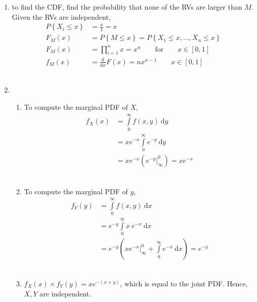 \begin{enumerate}
\begin{enumerate}
		
	\end{enumerate}
	
	\item to find the CDF, find the probability that none of the RVs are larger than $ M $. Given the RVs are independent, \\
	
	
		\begin{align}
			P\left\{X_i \leq x \right\} &= \frac{x}{1} = x \nonumber \\
			F_M (x) &= P\left\{M \leq x\right\} = P\left\{X_1 \leq x, \dots , X_n \leq x\right\} \nonumber \\
			F_M (x) &= \prod_{i = 1}^{n} x = x^n \qquad \text{for} \qquad x \in \left[0, 1\right] \\
			f_M (x) & = \frac{\mathrm{d}}{\mathrm{d} x} F(x) = nx^{n-1} \qquad x \in \left[0, 1\right]
		\end{align}\\
	
	
	\item 
		\begin{enumerate}
			\item To compute the marginal PDF of $ X $, 
			\begin{align}
				f_X (x) &= \int\limits_{0}^{\infty} f(x, y)\ \mathrm{d}y \nonumber \\
				&= x e^{-x} \int\limits_{0}^{\infty} e^{-y}\ \mathrm{d}y \nonumber \\
				&= x e^{-x} \left(e^{-y}\Big|_\infty^0\right) = x e^{-x}
			\end{align}\\
			
			\item To compute the marginal PDF of $ y $, 
			\begin{align}
				f_Y (y) &= \int\limits_{0}^{\infty} f(x, y)\ \mathrm{d}x \nonumber \\
				&= e^{-y} \int\limits_{0}^{\infty} x\ e^{-x}\ \mathrm{d}x \nonumber \\
				&= e^{-y} \left(xe^{-x}\Big|_\infty^0 + \int\limits_{0}^{\infty} e^{-x} \ \mathrm{d}x\right) = e^{-y}
			\end{align}\\
			
			\item $ f_X (x) \times f_Y (y)  = x e^{-(x + y)}$, which is equal to the joint PDF. Hence, $ X, Y $ are independent. \\
		\end{enumerate}
	

\end{enumerate}
